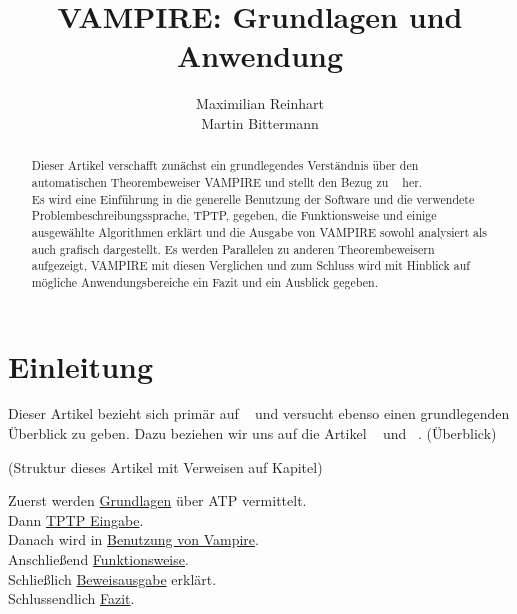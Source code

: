 \documentclass{article}
\author{
	Maximilian Reinhart\\
	Martin Bittermann
}
\title{VAMPIRE: Grundlagen und Anwendung}
\begin{document}
\maketitle

\begin{abstract}
	Dieser Artikel verschafft zunächst ein grundlegendes Verständnis über den automatischen Theorembeweiser VAMPIRE und
	stellt den Bezug zu ~\cite{cav2013} her. \\
	Es wird eine Einführung in die generelle Benutzung der Software und die verwendete Problembeschreibungssprache, TPTP, gegeben, 
	die Funktionsweise und einige ausgewählte Algorithmen erklärt und
	die Ausgabe von VAMPIRE sowohl analysiert als auch grafisch dargestellt.
	Es werden Parallelen zu anderen Theorembeweisern aufgezeigt, VAMPIRE mit diesen Verglichen 
	und zum Schluss wird mit Hinblick auf mögliche Anwendungsbereiche ein Fazit und ein Ausblick gegeben.
\end{abstract}


\section{Einleitung}
\label{sec:introduction}


Dieser Artikel bezieht sich primär auf ~\cite{cav2013} und versucht ebenso einen grundlegenden Überblick zu geben.
Dazu beziehen wir uns auf die Artikel ~\cite{hoder2010} und ~\cite{kovacs2009finding}.
(Überblick) 

(Struktur dieses Artikel mit Verweisen auf Kapitel)

Zuerst werden \hyperref[sec:foundations]{Grundlagen} über ATP vermittelt.\\
Dann \hyperref[sec:input]{TPTP Eingabe}.\\
Danach wird in \hyperref[sec:invocation]{Benutzung von Vampire}.\\
Anschließend \hyperref[sec:mechanics]{Funktionsweise}.\\
Schließlich \hyperref[sec:output]{Beweisausgabe} erklärt.\\
Schlussendlich \hyperref[sec:conclusion]{Fazit}.

\end{document}
